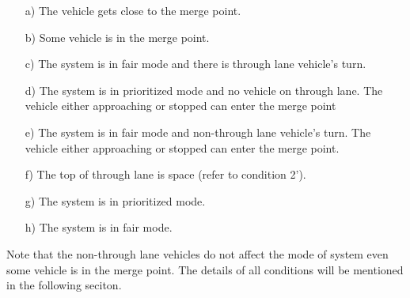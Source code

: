\documentclass[10pt, conference, compsocconf]{IEEEtran}
\begin{document}
\begin{itemize}
  \item[a)] The vehicle gets close to the merge point. 
  \item[b)] Some vehicle is in the merge point. 
  \item[c)] The system is in fair mode and there is through lane vehicle's turn. 
  \item[d)] The system is in prioritized mode and no vehicle on through lane. The vehicle either 
  approaching or stopped can enter the merge point
  \item[e)] The system is in fair mode and non-through lane vehicle's turn. The vehicle either 
  approaching or stopped can enter the merge point. 
  \item[f)] The top of through lane is space (refer to condition 2'). 
  \item[g)] The system is in prioritized mode.
  \item[h)] The system is in fair mode. 
\end{itemize}

Note that the non-through lane vehicles do not affect the mode of system even
some vehicle is in the merge point.
The details of all conditions will be mentioned in the following seciton.

 
\end{document}
